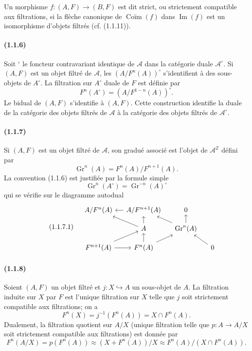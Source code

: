 \documentclass[10pt]{article}
\newcommand{\Z}{\mathbb Z}
\newcommand{\Gr}{\operatorname{Gr}}
\newcommand{\Imop}{\operatorname{Im}}
\newcommand{\calA}{\mathcal A}
\begin{document}
Un morphisme $f:(A,F)\to(B,F)$ est dit strict, ou strictement compatible aux filtrations, si la flèche canonique de $\operatorname{Coïm}(f)$ dans $\Imop(f)$ est un isomorphisme d'objets filtrés (cf. (1.1.11)).

\paragraph{(1.1.6)} Soit ${}^{\circ}$ le foncteur contravariant identique de $\calA$ dans la catégorie duale $\calA^{\circ}$. Si $(A,F)$ est un objet filtré de $\calA$, les $(A/F^n(A))^{\circ}$ s'identifient à des sous-objets de $A^{\circ}$. La filtration sur $A^{\circ}$ duale de $F$ est définie par
\[
F^n(A^{\circ})=(A/F^{1-n}(A))^{\circ}.
\]
Le bidual de $(A,F)$ s'identifie à $(A,F)$. Cette construction identifie la duale de la catégorie des objets filtrés de $\calA$ à la catégorie des objets filtrés de $\calA^{\circ}$.

\paragraph{(1.1.7)} Si $(A,F)$ est un objet filtré de $\calA$, son gradué associé est l'objet de $\calA^{\Z}$ défini par
\[
\Gr^n(A)=F^n(A)/F^{n+1}(A).
\]
La convention (1.1.6) est justifiée par la formule simple
\[
\Gr^n(A^{\circ})=\Gr^{-n}(A)^{\circ}
\]
qui se vérifie sur le diagramme autodual
\begin{equation}\tag{1.1.7.1}
\begin{tikzcd}[column sep=1.2em,row sep=1.0em]
& A/F^n(A) & A/F^{n+1}(A) \arrow[l] & 0 \\
& & A \arrow[ul] \arrow[u] & \Gr^n(A) \arrow[ul] \arrow[u] \\
& F^{n+1}(A) \arrow[r] \arrow[ur] & F^n(A) \arrow[u] \arrow[ur] & & 0 \arrow[ul]
\end{tikzcd}
\end{equation}

\paragraph{(1.1.8)} Soient $(A,F)$ un objet filtré et $j:X\hookrightarrow A$ un sous-objet de $A$. La filtration induite sur $X$ par $F$ est l'unique filtration sur $X$ telle que $j$ soit strictement compatible aux filtrations; on a
\[
F^n(X)=j^{-1}(F^n(A))=X\cap F^n(A).
\]
Dualement, la filtration quotient sur $A/X$ (unique filtration telle que $p:A\to A/X$ soit strictement compatible aux filtrations) est donnée par
\[
F^n(A/X)=p(F^n(A))\approx (X+F^n(A))/X\approx F^n(A)/(X\cap F^n(A)).
\]
\end{document}
